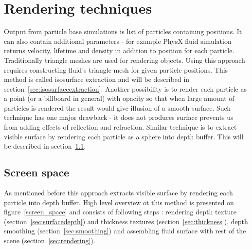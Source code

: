 
\chapter{Rendering techniques} %

\graphicspath{{techniques/figures/}}


Output from particle base simulations is list of particles containing positions. It can also contain additional parameters - for example PhysX fluid simulation returns velocity, lifetime and density in addition to position for each particle. 
Traditionally triangle meshes are used for rendering objects. Using this approach requires constructing fluid's triangle mesh for given particle positions. This method is called isosurface extraction and will be described in section~\ref{sec:isosurfaceextraction}.
Another possibility is to render each particle as a point (or a billboard in general) with opacity so that when large amount of particles is rendered the result would give illusion of a smooth surface. Such technique has one major drawback - it does not produces surface prevents us from adding effects of reflection and refraction.
Similar technique is to extract visible surface by rendering each particle as a sphere into depth buffer. This will be described in section~\ref{sec:screen_space}.

\section{Screen space} \label{sec:screen_space}
As mentioned before this approach extracts visible surface by rendering each particle into depth buffer. High level overview ot this method is presented on figure~\ref{screen_space} and consists of following steps \cite{laanSainz2009}: rendering depth texture (section~\ref{sec:surfacedepth}) and thickness textures (section~\ref{sec:thickness}), depth smoothing (section~\ref{sec:smoothing}) and assembling fluid surface with rest of the scene (section~\ref{sec:rendering}).

